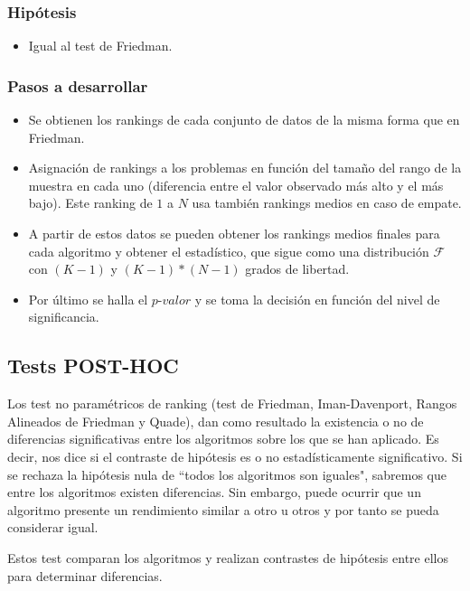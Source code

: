 \subsubsection{Hipótesis}
\begin{itemize}
\item Igual al test de Friedman.
\end{itemize}

\subsubsection{Pasos a desarrollar}
\begin{itemize}
\item Se obtienen los rankings de cada conjunto de datos de la misma forma que en Friedman.
\item Asignación de rankings a los problemas en función del tamaño del rango de la muestra en cada
uno (diferencia entre el valor observado más alto y el más bajo). Este ranking de $1$ a $N$ usa también
rankings medios en caso de empate.
\item A partir de estos datos se pueden obtener los rankings medios finales para cada algoritmo y obtener
el estadístico, que sigue como una distribución $\mathcal{F}$ con $(K-1)$ y $(K-1)*(N-1)$ grados de libertad.
\item Por último se halla el $\textit{p-valor}$ y se toma la decisión en función del nivel de significancia.
\end{itemize}


\subsection{Tests POST-HOC}
Los test no paramétricos de ranking (test de Friedman, Iman-Davenport, Rangos Alineados de Friedman y Quade),
dan como resultado la existencia o no de diferencias significativas entre los algoritmos sobre los que se han
aplicado. Es decir, nos dice si el contraste de hipótesis es o no estadísticamente significativo. Si se rechaza
la hipótesis nula de ``todos los algoritmos son iguales", sabremos que entre los algoritmos existen diferencias.
Sin embargo, puede ocurrir que un algoritmo presente un rendimiento similar a otro u otros y por tanto se pueda
considerar igual.

Estos test comparan los algoritmos y realizan contrastes de hipótesis entre ellos para determinar diferencias.

